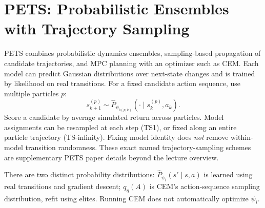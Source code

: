 \section{PETS: Probabilistic Ensembles with Trajectory Sampling}
PETS combines probabilistic dynamics ensembles, sampling-based propagation of candidate trajectories, and MPC planning with an optimizer such as CEM. Each model can predict Gaussian distributions over next-state changes and is trained by likelihood on real transitions. For a fixed candidate action sequence, use multiple particles $p$:
\begin{equation}
s_{k+1}^{(p)}\sim
\hat P_{\psi_{b(p,k)}}(\cdot\mid s_k^{(p)},a_k).
\end{equation}
Score a candidate by average simulated return across particles. Model assignments can be resampled at each step (TS1), or fixed along an entire particle trajectory (TS-infinity). Fixing model identity does \emph{not} remove within-model transition randomness. These exact named trajectory-sampling schemes are supplementary PETS paper details beyond the lecture overview.
\begin{pitfall}
There are two distinct probability distributions: $\hat P_{\psi_i}(s'\mid s,a)$ is learned using real transitions and gradient descent; $q_\eta(A)$ is CEM's action-sequence sampling distribution, refit using elites. Running CEM does not automatically optimize $\psi_i$.
\end{pitfall}

